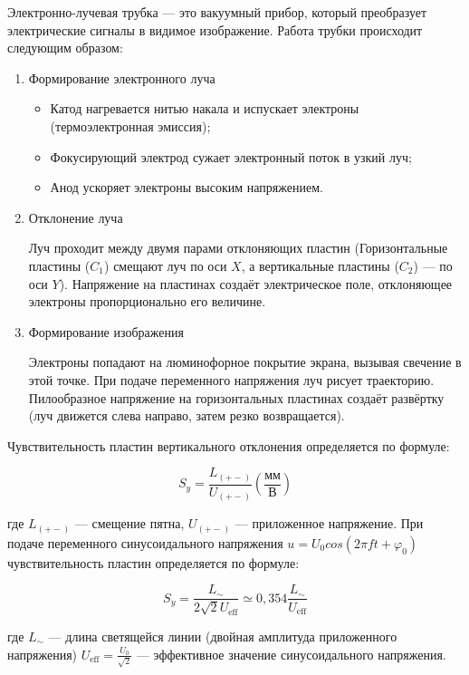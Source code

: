 Электронно-лучевая трубка — это вакуумный прибор, который преобразует электрические сигналы в видимое изображение. Работа трубки происходит следующим образом:
\begin{enumerate}

\item Формирование электронного луча
\begin{itemize}
\item Катод нагревается нитью накала и испускает электроны (термоэлектронная эмиссия);
\item Фокусирующий электрод сужает электронный поток в узкий луч;
\item Анод ускоряет электроны высоким напряжением.
\end{itemize}

\item Отклонение луча

Луч проходит между двумя парами отклоняющих пластин (Горизонтальные пластины ($C_1$) смещают луч по оси $X$, а вертикальные пластины ($C_2$) — по оси $Y$). Напряжение на пластинах создаёт электрическое поле, отклоняющее электроны пропорционально его величине.
\item Формирование изображения

Электроны попадают на люминофорное покрытие экрана, вызывая свечение в этой точке. При подаче переменного напряжения луч рисует траекторию. Пилообразное напряжение на горизонтальных пластинах создаёт развёртку (луч движется слева направо, затем резко возвращается).
\end{enumerate}

Чувствительность пластин вертикального отклонения определяется по формуле:

\begin{equation}
\label{eq:1}
   S_y = \frac{L_{(+-)}}{U_{(+-)}} \left( \frac{\text{мм}}{\text{В}} \right)
\end{equation}

где $L_{(+-)}$ — смещение пятна, $U_{(+-)}$ — приложенное напряжение. При подаче переменного синусоидального напряжения $u = U_0cos(2{\pi}ft + \varphi_0)$ чувствительность пластин определяется по формуле:

\begin{equation}
\label{eq:2}
   S_y = \frac{L_{\sim}}{2\sqrt{2}U_{\text{eff}}} \simeq 0,354 \frac{L_{\sim}}{U_{\text{eff}}}
\end{equation}

где $L_{\sim}$ — длина светящейся линии (двойная амплитуда приложенного напряжения) $U_{\text{eff}} = \frac{U_0}{\sqrt2}$ — эффективное значение синусоидального напряжения.

